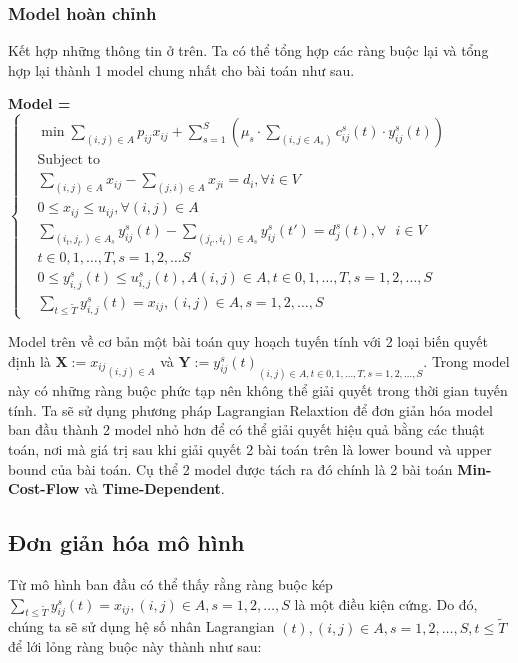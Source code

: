 \documentclass[a4paper]{article}
\begin{document}
\subsubsection{Model hoàn chỉnh}
Kết hợp những thông tin ở trên. Ta có thể tổng hợp các ràng buộc lại và tổng hợp lại thành 1 model chung nhất cho bài toán như sau.
\begin{center}
\textbf{Model = }
$\begin{cases}
&\min \sum_{(i,j)\in A} p_{ij}x_{ij} + \sum_{s=1}^{S}(\mu_s \cdot \sum_{(i,j \in A_s)}c^s_{ij}(t)\cdot y^s_{ij}(t)) \\
&\text{Subject to} \\
& \sum_{(i,j)\in A} x_{ij} - \sum_{(j,i)\in A}x_{ji} = d_i, \forall i\in V \\
&0\leqslant x_{ij} \leqslant u_{ij}, \forall (i,j) \in A \\
& \sum_{(i_t,j_{t'})\in A_s} y_{ij}^s(t) -\sum_{(j_{t'},i_t)\in A_s} y_{ij}^s(t') = d_j^s(t), \forall  \text{ } i \in V \\
&t\in {0,1,\dots , T} , s = 1,2,\dots S\\
& 0 \leqslant y_{i,j}^s (t) \leqslant u_{i,j}^s (t) , A (i,j) \in A,t \in {0,1,\dots , T} , s = 1,2,\dots , S \\
& \sum_{t\leqslant \tilde{T}}  y_{i,j}^s (t) = x_{ij},(i,j) \in A, s= 1,2,\dots ,S

\end{cases}$
\end{center}

Model trên về cơ bản một bài toán quy hoạch tuyến tính với 2 loại biến quyết định là $\textbf{X}:={x_{ij}}_{(i,j)\in A}$ và $\textbf{Y}:={y_{ij}^s (t)}_{(i,j)\in A,t \in {0,1,\dots , T},s=1,2,\dots ,S}$. Trong model này có những ràng buộc phức tạp nên không thể giải quyết trong thời gian tuyến tính. Ta sẽ sử dụng phương pháp Lagrangian Relaxtion để đơn giản hóa model ban đầu thành 2 model nhỏ hơn để có thể giải quyết hiệu quả bằng các thuật toán, nơi mà giá trị sau khi giải quyết 2 bài toán trên là lower bound và upper bound của bài toán. Cụ thể 2 model được tách ra đó chính là 2 bài toán \textbf{Min-Cost-Flow} và \textbf{Time-Dependent}. 
\subsection {Đơn giản hóa mô hình}
Từ mô hình ban đầu có thể thấy rằng ràng buộc kép $\sum_{t \leqslant \tilde{T} } y_{ij}^s (t) = x_{ij} , (i,j) \in A ,s = 1,2,\dots ,S $ là một điều kiện cứng. Do đó, chúng ta sẽ sử dụng hệ số nhân Lagrangian $(t),(i,j)\in A,s= 1,2,\dots ,S,t \leqslant \tilde{T}  $ để lới lỏng ràng buộc này thành như sau:
\end{document}
